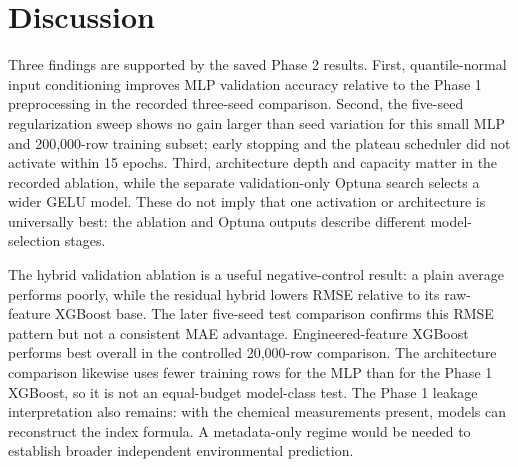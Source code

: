 \documentclass[conference]{IEEEtran}
\begin{document}
\section{Discussion}
Three findings are supported by the saved Phase 2 results. First, quantile-normal input conditioning improves MLP validation accuracy relative to the Phase 1 preprocessing in the recorded three-seed comparison. Second, the five-seed regularization sweep shows no gain larger than seed variation for this small MLP and 200,000-row training subset; early stopping and the plateau scheduler did not activate within 15 epochs. Third, architecture depth and capacity matter in the recorded ablation, while the separate validation-only Optuna search selects a wider GELU model. These do not imply that one activation or architecture is universally best: the ablation and Optuna outputs describe different model-selection stages.

The hybrid validation ablation is a useful negative-control result: a plain average performs poorly, while the residual hybrid lowers RMSE relative to its raw-feature XGBoost base. The later five-seed test comparison confirms this RMSE pattern but not a consistent MAE advantage. Engineered-feature XGBoost performs best overall in the controlled 20,000-row comparison. The architecture comparison likewise uses fewer training rows for the MLP than for the Phase 1 XGBoost, so it is not an equal-budget model-class test. The Phase 1 leakage interpretation also remains: with the chemical measurements present, models can reconstruct the index formula. A metadata-only regime would be needed to establish broader independent environmental prediction.
\end{document}
